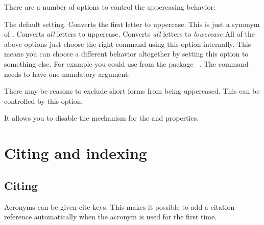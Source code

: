 \documentclass{acro-manual}
\begin{document}

There are a number of options to control the uppercasing behavior:
\begin{options}
    The default setting. Converts the first letter to uppercase.
    This is just a synonym of .
    Converts \emph{all} letters to uppercase.
    Converts \emph{all} letters to \emph{lowercase}
    All of the above options just choose the right command using this option
    internally. This means you can choose a different behavior altogether by
    setting this option to something else.  For example you could use
     from the package
    ~\cite{pkg:mfirstuc}. The command needs to have one
    mandatory argument.
\end{options}

There may be reasons to exclude short forms from being uppercased.  This can
be controlled by this option:
\begin{options}
    It allows you to disable the mechanism for the  and
     properties.
\end{options}

\section{Citing and indexing}\label{sec:citing-indexing}
\subsection{Citing}\label{sec:citing}
Acronyms can be given cite keys.  This makes it possible to add a citation
reference automatically when the acronym is used for the first time.
\end{document}
